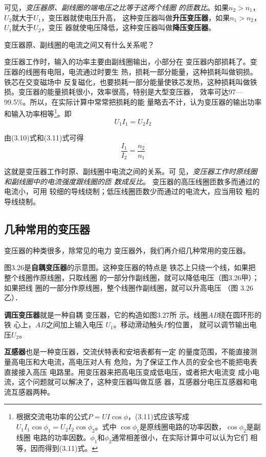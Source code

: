 可见，\textit{变压器原、副线圈的端电压之比等于这两个线圈
的匝数比}。如果$n_2>n_1$，$U_2$就大于$U_1$，变压器就使电压升高，
这种变压器叫做\textbf{升压变压器}，如果$n_1>n_2$，$U_1$就大于$U_2$，变压
器就使电压降低，这种变压器叫做\textbf{降压变压器}。

变压器原、副线圈的电流之间又有什么关系呢？

变压器工作时，输入的功率主要由副线圈输出，小部分在
变压器内部损耗了。变压器的线圈有电阻，电流通过时要生
热，损耗一部分能量，这种损耗叫做铜损。铁芯在交变磁场中
反复磁化，也要损耗一部分能量使铁芯发热，这种损耗叫做铁
损。变压器的能量损耗很小，效率很高，特别是大型变压器，
效率可达97—99.5\%。所以，在实际计算中常常把损耗的能
量略去不计，认为变压器的输出功率和输入功率相等\footnote{根据交流电功率的公式$P=UI\cos\phi$，(3.11)式应该写成$U_1I_1\cos\phi_1
=U_2I_2\cos\phi_2$。式中 $\cos\phi_1$是原线圈电路的功率因数，$\cos\phi_2$是副线圈
电路的功率因数。$\phi_1$和$\phi_2$通常相差很小，在实际计算中可以认为它们
相等，因而得到(3.11)式。}。即
\begin{equation}
    U_1I_1=U_2I_2
\end{equation}

由(3.10)式和(3.11)式可得
\begin{equation}
    \frac{I_1}{I_2}=\frac{n_2}{n_1}
\end{equation}

这就是变压器工作时原、副线圈中电流之间的关系。可
见，\textit{变压器工作时原线圈和副线圈中的电流强度跟线圈的匝
数成反比}。
变压器的高压线圈匝数多而通过的电流小，可用
较细的导线绕制；低压线圈匝数少而通过的电流大，应当用较
粗的导线绕制。

\subsection{几种常用的变压器}

变压器的种类很多，除常见的电力
变压器外，我们再介绍几种常用的变压器。

图3.26是\textbf{自耦变压器}的示意图。这种变压器的特点是
铁芯上只绕一个线，如果把整个线圈作原线圈，只取线圈
的一部分作副线圈，就可以降低电压（图3.26甲）；如果把线
圈的一部分作原线圈，整个线圈作副线圈，就可以升高电压
（图 3.26乙）．

\textbf{调压变压器}就是一种自耦
变压器，它的构造如图3.27所
示。线圈$AB$绕在圆环形的铁
心上，$AB$之间加上输入电压
$U_1$。移动滑动触头$P$的位置，
就可以调节输出电压$U_2$。

\textbf{互感器}也是一种变压器，交流伏特表和安培表都有一定
的量度范围，不能直接测量高电压和大电流，高电压对人有
危险，为了保证工作人员的安全也不能把电表直接接入高压
电路里。用变压器来把高电压变成低电压，或者把大电流变
成小电流，这个问题就可以解决了，这种变压器叫做互感
器，互感器分电压互感器和电流互感器两种。

